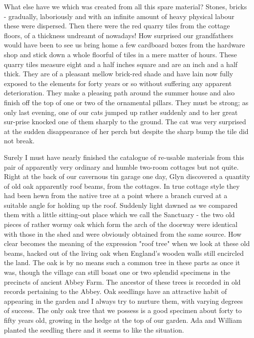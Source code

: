 What else have we which was created from all this spare material? Stones, bricks - gradually, laboriously and with an infinite amount of heavy physical labour these were dispersed. Then there were the red quarry tiles from the cottage floors, of a thickness undreamt of nowadays! How surprised our grandfathers would have been to see us bring home a few cardboard boxes from the hardware shop and stick down a whole floorful of tiles in a mere matter of hours. These quarry tiles measure eight and a half inches square and are an inch and a half thick. They are of a pleasant mellow brick-red shade and have lain now fully exposed to the elements for forty years or so without suffering any apparent deterioration. They make a pleasing path around the summer house and also finish off the top of one or two of the ornamental pillars. They must be strong; as only last evening, one of our cats jumped up rather suddenly and to her great sur-prise knocked one of them sharply to the ground. The cat was very surprised at the sudden disappearance of her perch but despite the sharp bump the tile did not break.

Surely I must have nearly finished the catalogue of re-usable materials from this pair of apparently very ordinary and humble two-room cottages but not quite. Right at the back of our cavernous tin garage one day, Glyn discovered a quantity of old oak apparently roof beams, from the cottages. In true cottage style they had been hewn from the native tree at a point where a branch curved at a suitable angle for holding up the roof. Suddenly light dawned as we compared them with a little sitting-out place which we call the Sanctuary - the two old pieces of rather wormy oak which form the arch of the doorway were identical with those in the shed and were obviously obtained from the same source. How clear becomes the meaning of the expression "roof tree" when we look at these old beams, hacked out of the living oak when England's wooden walls still encircled the land. The oak is by no means such a common tree in these parts as once it was, though the village can still boast one or two splendid specimens in the precincts of ancient Abbey Farm. The ancestor of these trees is recorded in old records pertaining to the Abbey. Oak seedlings have an attractive habit of appearing in the garden and I always try to nurture them, with varying degrees of success. The only oak tree that we possess is a good specimen about forty to fifty years old, growing in the hedge at the top of our garden. Ada and William planted the seedling there and it seems to like the situation.

